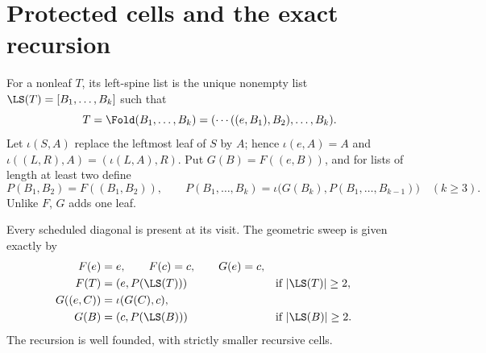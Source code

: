 \section{Protected cells and the exact recursion}\label{sec:cells}

For a nonleaf \(T\), its left-spine list is the unique nonempty list
\(\LS(T)=[B_1,\ldots,B_k]\) such that
\[
 T=\Fold(B_1,\ldots,B_k)
   =(\cdots((e,B_1),B_2),\ldots,B_k).
\]
Let \(\iota(S,A)\) replace the leftmost leaf of \(S\) by \(A\); hence
\(\iota(e,A)=A\) and
\(\iota((L,R),A)=(\iota(L,A),R)\).
Put \(G(B)=F((e,B))\), and for lists of length at least two define
\begin{equation}\label{eq:product}
 P(B_1,B_2)=F((B_1,B_2)),\qquad
 P(B_1,\ldots,B_k)=\iota\bigl(G(B_k),P(B_1,\ldots,B_{k-1})\bigr)
 \quad(k\ge3).
\end{equation}
Unlike \(F\), \(G\) adds one leaf.

\begin{lemma}\label{lem:cells}
Every scheduled diagonal is present at its visit. The geometric sweep is
given exactly by
\begin{align}
 F(e)&=e,\qquad F(c)=c,\qquad G(e)=c, \label{eq:bases}\\
 F(T)&=(e,P(\LS(T))) &&\text{if }|\LS(T)|\ge2, \label{eq:non-ear}\\
 G((e,C))&=\iota(G(C),c), \label{eq:ear-one}\\
 G(B)&=(c,P(\LS(B))) &&\text{if }|\LS(B)|\ge2. \label{eq:ear-many}
\end{align}
The recursion is well founded, with strictly smaller recursive cells.
\end{lemma}


